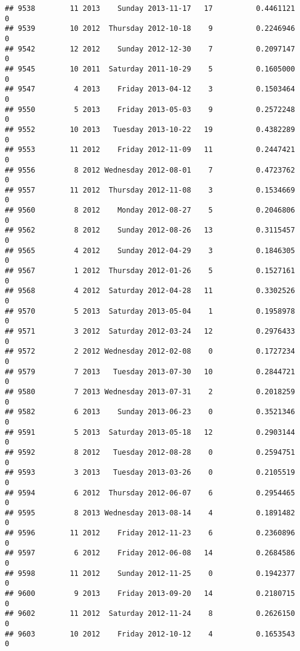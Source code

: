 \documentclass[
]{article}
\begin{document}
\begin{verbatim}
## 9538        11 2013    Sunday 2013-11-17   17          0.4461121             0
## 9539        10 2012  Thursday 2012-10-18    9          0.2246946             0
## 9542        12 2012    Sunday 2012-12-30    7          0.2097147             0
## 9545        10 2011  Saturday 2011-10-29    5          0.1605000             0
## 9547         4 2013    Friday 2013-04-12    3          0.1503464             0
## 9550         5 2013    Friday 2013-05-03    9          0.2572248             0
## 9552        10 2013   Tuesday 2013-10-22   19          0.4382289             0
## 9553        11 2012    Friday 2012-11-09   11          0.2447421             0
## 9556         8 2012 Wednesday 2012-08-01    7          0.4723762             0
## 9557        11 2012  Thursday 2012-11-08    3          0.1534669             0
## 9560         8 2012    Monday 2012-08-27    5          0.2046806             0
## 9562         8 2012    Sunday 2012-08-26   13          0.3115457             0
## 9565         4 2012    Sunday 2012-04-29    3          0.1846305             0
## 9567         1 2012  Thursday 2012-01-26    5          0.1527161             0
## 9568         4 2012  Saturday 2012-04-28   11          0.3302526             0
## 9570         5 2013  Saturday 2013-05-04    1          0.1958978             0
## 9571         3 2012  Saturday 2012-03-24   12          0.2976433             0
## 9572         2 2012 Wednesday 2012-02-08    0          0.1727234             0
## 9579         7 2013   Tuesday 2013-07-30   10          0.2844721             0
## 9580         7 2013 Wednesday 2013-07-31    2          0.2018259             0
## 9582         6 2013    Sunday 2013-06-23    0          0.3521346             0
## 9591         5 2013  Saturday 2013-05-18   12          0.2903144             0
## 9592         8 2012   Tuesday 2012-08-28    0          0.2594751             0
## 9593         3 2013   Tuesday 2013-03-26    0          0.2105519             0
## 9594         6 2012  Thursday 2012-06-07    6          0.2954465             0
## 9595         8 2013 Wednesday 2013-08-14    4          0.1891482             0
## 9596        11 2012    Friday 2012-11-23    6          0.2360896             0
## 9597         6 2012    Friday 2012-06-08   14          0.2684586             0
## 9598        11 2012    Sunday 2012-11-25    0          0.1942377             0
## 9600         9 2013    Friday 2013-09-20   14          0.2180715             0
## 9602        11 2012  Saturday 2012-11-24    8          0.2626150             0
## 9603        10 2012    Friday 2012-10-12    4          0.1653543             0

\end{verbatim}
\end{document}
